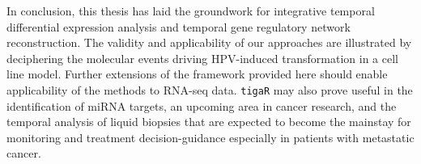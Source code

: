 \begin{conclusion}
In conclusion, this thesis has laid the groundwork for integrative temporal differential expression analysis and temporal gene regulatory network reconstruction. The validity and applicability of our approaches are illustrated by deciphering the molecular events driving HPV-induced transformation in a cell line model. Further extensions of the framework provided here should enable applicability of the methods to RNA-seq data. {\tt tigaR} may also prove useful in the identification of miRNA targets, an upcoming area in cancer research, and the temporal analysis of liquid biopsies that are expected to become the mainstay for monitoring and treatment decision-guidance especially in patients with metastatic cancer. 


\end{conclusion}
